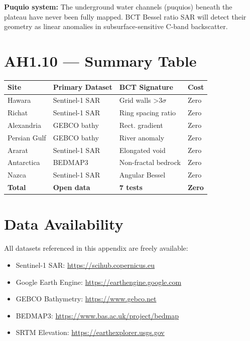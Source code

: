 \documentclass[12pt,twocolumn]{article}
\begin{document}
\textbf{Puquio system:} The underground water channels
(puquios) beneath the plateau have never been fully mapped.
BCT Bessel ratio SAR will detect their geometry as linear
anomalies in subsurface-sensitive C-band backscatter.

\section{AH1.10 --- Summary Table}

\begin{center}
{\small
\begin{tabular}{p{1.6cm}p{2.1cm}p{2.0cm}p{1.3cm}}
\hline\hline
Site & Primary Dataset & BCT Signature & Cost \\
\hline
Hawara & Sentinel-1 SAR & Grid walls >3$\sigma$ & Zero \\
Richat & Sentinel-1 SAR & Ring spacing ratio & Zero \\
Alexandria & GEBCO bathy & Rect. gradient & Zero \\
Persian Gulf & GEBCO bathy & River anomaly & Zero \\
Ararat & Sentinel-1 SAR & Elongated void & Zero \\
Antarctica & BEDMAP3 & Non-fractal bedrock & Zero \\
Nazca & Sentinel-1 SAR & Angular Bessel & Zero \\
\hline
\textbf{Total} & \textbf{Open data} & \textbf{7 tests} & \textbf{Zero} \\
\hline\hline
\end{tabular}
}
\end{center}

\section*{Data Availability}

All datasets referenced in this appendix are freely available:
\begin{itemize}
\item Sentinel-1 SAR: \url{https://scihub.copernicus.eu}
\item Google Earth Engine: \url{https://earthengine.google.com}
\item GEBCO Bathymetry: \url{https://www.gebco.net}
\item BEDMAP3: \url{https://www.bas.ac.uk/project/bedmap}
\item SRTM Elevation: \url{https://earthexplorer.usgs.gov}
\end{itemize}
\end{document}
